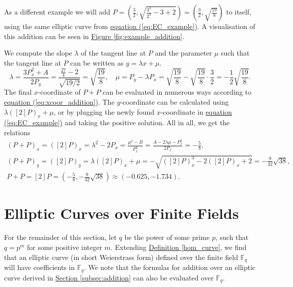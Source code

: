 \documentclass[openany, a4paper, 10pt]{book}
\theoremstyle{plain}
\theoremstyle{plain}
\theoremstyle{plain}
\theoremstyle{definition}
\theoremstyle{plain}
\theoremstyle{definition}
\theoremstyle{remark}
\renewcommand{\eqref}[1]{\hyperref[#1]{equation (\ref{#1})}}
\newcommand{\figref}[1]{\hyperref[#1]{Figure \ref{#1}}}
\newcommand{\defref}[1]{\hyperref[#1]{Definition \ref{#1}}}
\newcommand{\secref}[1]{\hyperref[#1]{Section \ref{#1}}}
\begin{document}
\begin{examplebox}
    As a different example we will add
    $P=\left(\frac{3}{2}, \sqrt{\frac{3^3}{2^3} - 3 + 2}\right) = \left( \frac{3}{2}, \sqrt{\frac{19}{8}} \right)$
    to itself, using the same elliptic curve from \eqref{eq:EC_example}.
    A visualisation of this addition can be seen in \figref{fig:example_addition}.

    We compute the slope $\lambda$ of the tangent line at $P$ and the parameter $\mu$ such that the tangent line at $P$ can be written as $y = \lambda x + \mu$.
    \begin{equation*}
        \lambda = \frac{3P_x^2 + A}{2P_y} = \frac{\frac{27}{4}-2}{\sqrt{19/2}} = \sqrt{\frac{19}{8}}, \quad
        \mu = P_y-\lambda P_x
          = \sqrt{\frac{19}{8}} -\sqrt{\frac{19}{8}} \cdot \frac{3}{2}
          = -\frac{1}{2} \sqrt{\frac{19}{8}}.
    \end{equation*}
    The final $x$-coordinate of $P+P$ can be evaluated in numerous ways according to \eqref{eq:xcoor_addition}.
    The $y$-coordinate can be calculated using $\lambda ([2]P)_x + \mu$,
    or by plugging the newly found $x$-coordinate in \eqref{eq:EC_example} and taking the positive solution.
    All in all, we get the relations
    \begin{gather*}
        (P+P)_x = ([2]P)_x = \lambda^2 - 2P_x = \frac{\mu^2-B}{P_x^2} = \frac{A - 2\lambda \mu - P_x^2}{2P_x} = -\frac{5}{8}, \\
        (P+P)_y = ([2]P)_y = \lambda ([2]P)_x + \mu = -\sqrt{([2]P)_x^3 - 2 ([2]P)_x + 2} = -\frac{9}{32} \sqrt{38}, \\
        P+P = [2]P = \left(-\frac{5}{8}, -\frac{9}{32}\sqrt{38}\right) \approx (-0.625, -1.734).
    \end{gather*}
\end{examplebox}


\section{Elliptic Curves over Finite Fields}\label{sec:ec_over_ff}
For the remainder of this section, let $q$ be the power of some prime $p$, such that $q=p^m$ for some positive integer $m$.
Extending \defref{hom_curve}, we find that an elliptic curve (in short Weierstrass form) defined over the finite field $\mathbb F_q$ will have coefficients in $\mathbb F_q$.
We note that the formulas for addition over an elliptic curve derived in \secref{subsec:addition} can also be evaluated over $\mathbb F_q$.
\end{document}
